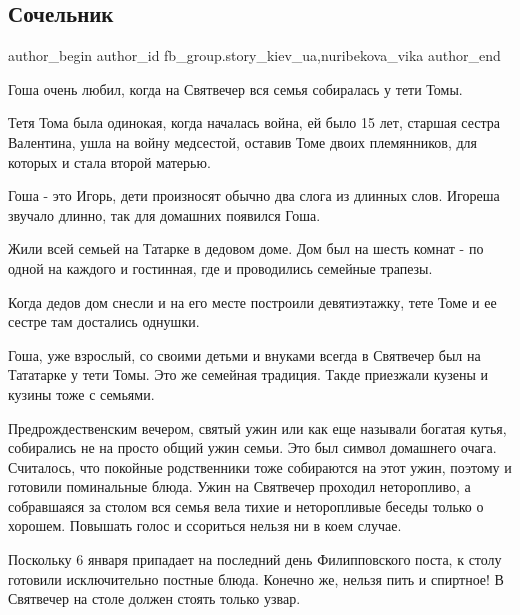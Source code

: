  
 
 
 
 
 
\subsection{Сочельник}
\label{sec:07_01_2022.fb.fb_group.story_kiev_ua.1.sochelnik}
 
\ifcmt
 author_begin
   author_id fb_group.story_kiev_ua,nuribekova_vika
 author_end
\fi

Гоша очень любил, когда на Святвечер вся семья собиралась у тети Томы. 

Тетя Тома была одинокая, когда началась война, ей было 15 лет, старшая сестра
Валентина, ушла на войну медсестой, оставив Томе двоих племянников, для которых
и стала второй матерью. 

Гоша - это Игорь, дети произносят обычно два слога из длинных слов. Игореша
звучало  длинно, так для домашних появился Гоша.

Жили всей семьей на Татарке в дедовом доме. Дом был на шесть комнат - по одной
на каждого и гостинная, где и проводились семейные трапезы.

Когда дедов дом снесли и на его месте построили девятиэтажку, тете Томе и ее
сестре там достались однушки. 

Гоша, уже взрослый, со своими детьми и внуками всегда в Святвечер был на
Тататарке у тети Томы. Это же семейная традиция. Такде приезжали кузены и
кузины тоже с семьями.

Предрождественским вечером, святый ужин или как еще называли богатая кутья,
собирались не на просто общий ужин семьи. Это был символ домашнего очага.
Считалось, что покойные родственники тоже собираются на этот ужин, поэтому и
готовили поминальные блюда. Ужин на Святвечер проходил неторопливо, а
собравшаяся за столом вся семья вела тихие и неторопливые беседы только о
хорошем. Повышать голос и ссориться нельзя ни в коем случае. 

Поскольку 6 января припадает на последний день Филипповского поста, к столу
готовили исключительно постные блюда. Конечно же, нельзя пить и спиртное! В
Святвечер на столе должен стоять только узвар.

